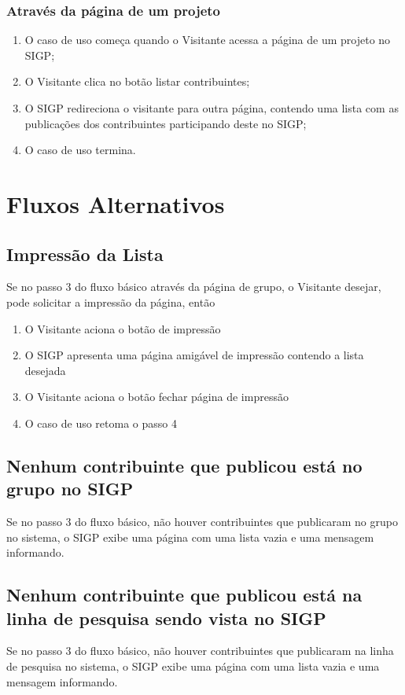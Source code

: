 \documentclass[11pt, a4paper,oneside]{book}
\begin{document}
\subsubsection{Através da página de um projeto}
\begin{enumerate}
\item O caso de uso começa quando o Visitante acessa a página de um projeto no SIGP;
\item O Visitante clica no botão listar contribuintes;
\item O SIGP redireciona o visitante para outra página, contendo uma lista com as publicações dos contribuintes participando deste no SIGP;
\item O caso de uso termina.
\end{enumerate}

\section{Fluxos Alternativos}

\subsection{Impressão da Lista}
Se no passo $3$ do fluxo básico através da página de grupo, o Visitante desejar, pode solicitar a impressão da página, então

\begin{enumerate}
\item O Visitante aciona o botão de impressão
\item O SIGP apresenta uma página amigável de impressão contendo a lista desejada
\item O Visitante aciona o botão fechar página de impressão
\item O caso de uso retoma o passo 4
\end{enumerate}

\subsection{Nenhum contribuinte que publicou está no grupo no SIGP}
Se no passo $3$ do fluxo básico, não houver contribuintes que publicaram no grupo no sistema, o SIGP exibe uma página com uma lista vazia e uma mensagem informando.

\subsection{Nenhum contribuinte que publicou está na linha de pesquisa sendo vista no SIGP}
Se no passo $3$ do fluxo básico, não houver contribuintes que publicaram na linha de pesquisa no sistema, o SIGP exibe uma página com uma lista vazia e uma mensagem informando.
\end{document}
